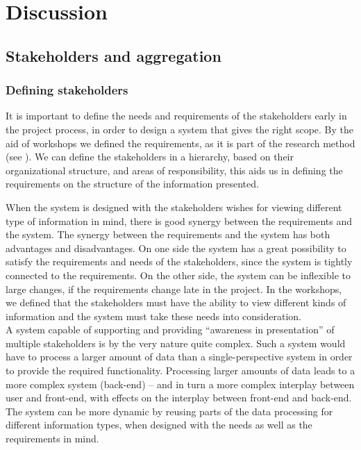 \chapter{Discussion}
\label{chapter:discussion}

\section{Stakeholders and aggregation} %
\label{sec:discussion_stakeholders'_and_aggregation}
\subsection{Defining stakeholders} %
\label{sub:disc_defining_stakeholders}
It is important to define the needs and requirements of the stakeholders 
early in the project process, in order to design a system that gives the right scope. 
By the aid of workshops we defined the requirements, as it is part of the 
research method (see ). We can define the stakeholders in 
a hierarchy, based on their organizational structure, and areas of 
responsibility, this aids us in defining the requirements on the structure of 
the information presented.

When the system is designed with the stakeholders wishes for viewing different type of information in mind, there is good synergy between the requirements and the system. The synergy between the requirements and the system has 
both advantages and disadvantages. On one side the system has a great 
possibility to satisfy the requirements and needs of the stakeholders, since 
the system is tightly connected to the requirements. On the other side, the 
system can be inflexible to large changes, if the requirements change late in 
the project. In the workshops, we defined that the stakeholders must have the 
ability to view different kinds of information and the system must take these 
needs into consideration. \\

A system capable of supporting and providing 
“awareness in presentation” of multiple stakeholders is by the very nature 
quite complex. Such a system would have to process a larger amount of data than 
a single-perspective system in order to provide the required functionality. 
Processing larger amounts of data leads to a more complex system (back-end) – 
and in turn a more complex interplay between user and front-end, with effects 
on the interplay between front-end and back-end. The system can be more 
dynamic by reusing parts of the data processing for 
different information types, when designed with the needs as well as the 
requirements in mind. 

